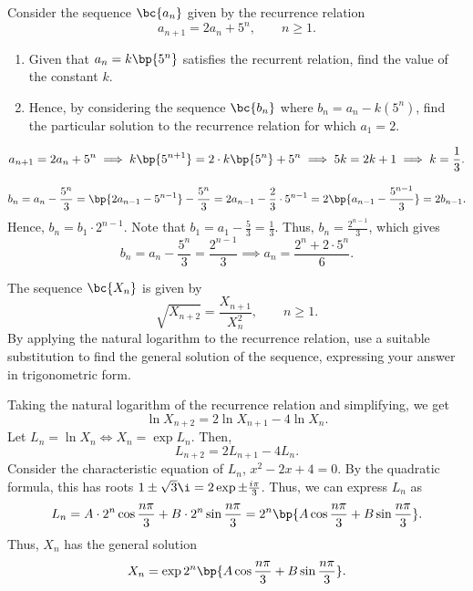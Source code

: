 \clearpage
\begin{problem}
    Consider the sequence $\bc{a_n}$ given by the recurrence relation \[a_{n+1} = 2a_n + 5^n, \qquad n \geq 1.\]

    \begin{enumerate}
        \item Given that $a_n = k\bp{5^n}$ satisfies the recurrent relation, find the value of the constant $k$.
        \item Hence, by considering the sequence $\bc{b_n}$ where $b_n = a_n - k(5^n)$, find the particular solution to the recurrence relation for which $a_1 = 2$.
    \end{enumerate}
\end{problem}
\begin{solution}
    \begin{ppart}
        \[a_{n+1} = 2a_n + 5^n \implies k\bp{5^{n+1}} = 2\cdot k\bp{5^n} + 5^n \implies 5k = 2k + 1 \implies k = \frac13.\]
    \end{ppart}
    \begin{ppart}
        \[b_n = a_n - \frac{5^n}3 = \bp{2a_{n-1} - 5^{n-1}} - \frac{5^n}3 = 2a_{n-1} - \frac23 \cdot 5^{n-1} = 2\bp{a_{n-1} - \frac{5^{n-1}}3} = 2b_{n-1}.\] Hence, $b_n = b_1 \cdot 2^{n-1}$. Note that $b_1 = a_1 - \frac53 = \frac13$. Thus, $b_n = \frac{2^{n-1}}3$, which gives 
        \[b_n = a_n - \frac{5^n}{3} = \frac{2^{n-1}}3 \implies a_n = \frac{2^n + 2 \cdot 5^n}6.\]
    \end{ppart}
\end{solution}

\begin{problem}
    The sequence $\bc{X_n}$ is given by \[\sqrt{X_{n+2}} = \frac{X_{n+1}}{X_n^2}, \qquad n \geq 1.\] By applying the natural logarithm to the recurrence relation, use a suitable substitution to find the general solution of the sequence, expressing your answer in trigonometric form.
\end{problem}
\begin{solution}
    Taking the natural logarithm of the recurrence relation and simplifying, we get \[\ln X_{n+2} = 2\ln X_{n+1} - 4\ln X_n.\] Let $L_n = \ln X_n \iff X_n = \exp{L_n}$. Then, \[L_{n+2} = 2L_{n+1} - 4L_n.\] Consider the characteristic equation of $L_n$, $x^2 - 2x + 4 = 0$. By the quadratic formula, this has roots $1 \pm \sqrt3 \i = 2\exp{\pm \frac{i\pi}3}$. Thus, we can express $L_n$ as \[L_n = A \cdot 2^n \cos \frac{n\pi}3 + B \cdot 2^n \sin\frac{n\pi}3 = 2^n \bp{A \cos \frac{n\pi}3 + B \sin \frac{n\pi}3}.\] Thus, $X_n$ has the general solution \[X_n = \exp{2^n \bp{A \cos\frac{n\pi}3 + B \sin \frac{n\pi}3}}.\]
\end{solution}


